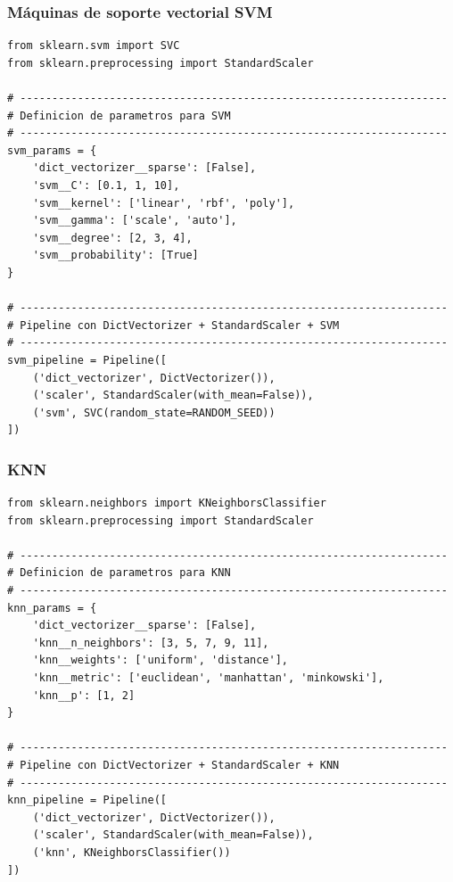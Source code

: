 \documentclass[11pt,a4paper,spanish]{book}
\numberwithin{equation}{chapter}
\numberwithin{figure}{chapter}
\begin{document}
\subsubsection{Máquinas de soporte vectorial SVM}


\begin{lstlisting}
from sklearn.svm import SVC
from sklearn.preprocessing import StandardScaler

# -------------------------------------------------------------------
# Definicion de parametros para SVM
# -------------------------------------------------------------------
svm_params = {
    'dict_vectorizer__sparse': [False],
    'svm__C': [0.1, 1, 10],                  
    'svm__kernel': ['linear', 'rbf', 'poly'],
    'svm__gamma': ['scale', 'auto'],         
    'svm__degree': [2, 3, 4],                
    'svm__probability': [True]               
}

# -------------------------------------------------------------------
# Pipeline con DictVectorizer + StandardScaler + SVM
# -------------------------------------------------------------------
svm_pipeline = Pipeline([
    ('dict_vectorizer', DictVectorizer()),
    ('scaler', StandardScaler(with_mean=False)),  
    ('svm', SVC(random_state=RANDOM_SEED))
])
\end{lstlisting}


\subsubsection{KNN}


\begin{lstlisting}
from sklearn.neighbors import KNeighborsClassifier
from sklearn.preprocessing import StandardScaler

# -------------------------------------------------------------------
# Definicion de parametros para KNN
# -------------------------------------------------------------------
knn_params = {
    'dict_vectorizer__sparse': [False],
    'knn__n_neighbors': [3, 5, 7, 9, 11],     
    'knn__weights': ['uniform', 'distance'],  
    'knn__metric': ['euclidean', 'manhattan', 'minkowski'],  
    'knn__p': [1, 2]  
}

# -------------------------------------------------------------------
# Pipeline con DictVectorizer + StandardScaler + KNN
# -------------------------------------------------------------------
knn_pipeline = Pipeline([
    ('dict_vectorizer', DictVectorizer()),
    ('scaler', StandardScaler(with_mean=False)),  
    ('knn', KNeighborsClassifier())
])
\end{lstlisting}
\end{document}
